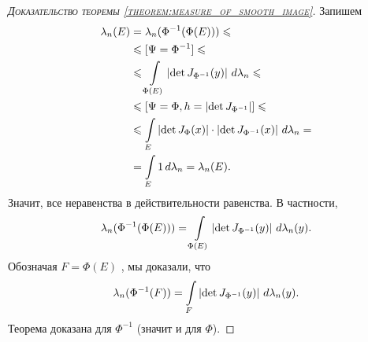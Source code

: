\begin{proof}[\normalfont\textsc{Доказательство теоремы \ref{theorem:measure_of_smooth_image}}]
 Запишем \begin{align*}
  \lambda_n(E) &= \lambda_n(\Phi^{-1}(\Phi(E))) \leqslant \\
  &\leqslant [\Psi = \Phi^{-1}] \leqslant \\
  &\leqslant \int\limits_{\Phi(E)} \left| \det J_{\Phi^{-1}}(y) \right| \, d\lambda_n \leqslant \\
  &\leqslant [\Psi = \Phi, h = \left| \det J_{\Phi^{-1}} \right|] \leqslant \\
  &\leqslant \int\limits_{E} \left| \det J_{\Phi}(x) \right| \cdot \left| \det J_{\Phi^{-1}}(x) \right| \, d\lambda_n  = \\
  &= \int\limits_{E} 1 \, d\lambda_n = \lambda_n(E)  
 .\end{align*} Значит, все неравенства в действительности равенства. В частности,
 \begin{align*}
  \lambda_n(\Phi^{-1}(\Phi(E))) = \int\limits_{\Phi(E)} \left| \det J_{\Phi^{-1}}(y) \right| \, d\lambda_n(y)
 .\end{align*} Обозначая $F = \Phi(E)$ , мы доказали, что \begin{align*}
 \lambda_n(\Phi^{-1}(F)) = \int\limits_{F} \left| \det J_{\Phi^{-1}}(y) \right| \, d\lambda_n(y)
 .\end{align*} Теорема доказана для $\Phi^{-1}$ (значит и для $\Phi$).
\end{proof}

